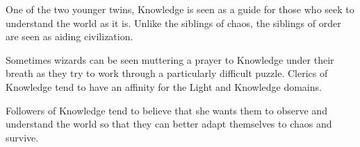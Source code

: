 One of the two younger twins, Knowledge is seen as a guide for those who seek to understand the world as it is.
Unlike the siblings of chaos, the siblings of order are seen as aiding civilization.

Sometimes wizards can be seen muttering a prayer to Knowledge under their breath as they try to work through a particularly difficult puzzle.
Clerics of Knowledge tend to have an affinity for the Light and Knowledge domains.

Followers of Knowledge tend to believe that she wants them to observe and understand the world so that they can better adapt themselves to chaos and survive.
